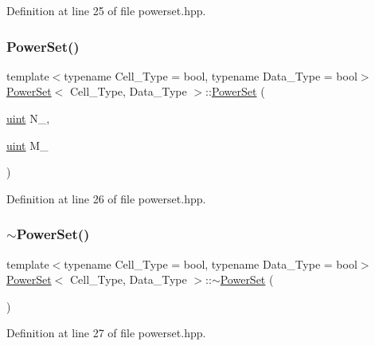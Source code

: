 Definition at line 25 of file powerset.\+hpp.

\mbox{\label{class_power_set_a2b1a73cd0b9a1dbab0a139d32d4e8b8d}} 
\subsubsection{\texorpdfstring{Power\+Set()}{PowerSet()}\hspace{0.1cm}{\footnotesize\ttfamily [2/2]}}
{\footnotesize\ttfamily template$<$typename Cell\+\_\+\+Type  = bool, typename Data\+\_\+\+Type  = bool$>$ \\
\hyperlink{class_power_set}{Power\+Set}$<$ Cell\+\_\+\+Type, Data\+\_\+\+Type $>$\+::\hyperlink{class_power_set}{Power\+Set} (\begin{DoxyParamCaption}\item[{\hyperlink{typedefs_8hpp_a91ad9478d81a7aaf2593e8d9c3d06a14}{uint}}]{N\+\_\+,  }\item[{\hyperlink{typedefs_8hpp_a91ad9478d81a7aaf2593e8d9c3d06a14}{uint}}]{M\+\_\+ }\end{DoxyParamCaption})\hspace{0.3cm}{\ttfamily [inline]}}



Definition at line 26 of file powerset.\+hpp.

\mbox{\label{class_power_set_a6736bc9d8a2a57669f3531ecb429c42f}} 
\subsubsection{\texorpdfstring{$\sim$\+Power\+Set()}{~PowerSet()}}
{\footnotesize\ttfamily template$<$typename Cell\+\_\+\+Type  = bool, typename Data\+\_\+\+Type  = bool$>$ \\
\hyperlink{class_power_set}{Power\+Set}$<$ Cell\+\_\+\+Type, Data\+\_\+\+Type $>$\+::$\sim$\hyperlink{class_power_set}{Power\+Set} (\begin{DoxyParamCaption}{ }\end{DoxyParamCaption})\hspace{0.3cm}{\ttfamily [inline]}}



Definition at line 27 of file powerset.\+hpp.



